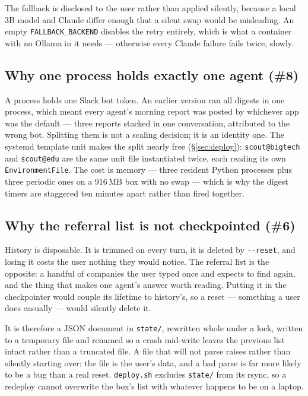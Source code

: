\documentclass[11pt,a4paper]{article}
\begin{document}
The fallback is disclosed to the user rather than applied silently, because a local 3B model
and Claude differ enough that a silent swap would be misleading. An empty
\texttt{FALLBACK\_\allowbreak{}BACKEND} disables the retry entirely, which is what a container with no
Ollama in it needs --- otherwise every Claude failure fails twice, slowly.

\subsection{Why one process holds exactly one agent (\#8)}

A process holds one Slack bot token. An earlier version ran all digests in one process,
which meant every agent's morning report was posted by whichever app was the default ---
three reports stacked in one conversation, attributed to the wrong bot. Splitting them is
not a scaling decision; it is an identity one. The systemd template unit makes the split
nearly free (\S\ref{sec:deploy}): \texttt{scout@bigtech} and \texttt{scout@edu} are the same
unit file instantiated twice, each reading its own \texttt{EnvironmentFile}. The cost is
memory --- three resident Python processes plus three periodic ones on a 916\,MB box with no
swap --- which is why the digest timers are staggered ten minutes apart rather than fired
together.

\subsection{Why the referral list is not checkpointed (\#6)}

History is disposable. It is trimmed on every turn, it is deleted by \texttt{-{}-reset}, and
losing it costs the user nothing they would notice. The referral list is the opposite: a
handful of companies the user typed once and expects to find again, and the thing that makes
one agent's answer worth reading. Putting it in the checkpointer would couple its lifetime to
history's, so a reset --- something a user does casually --- would silently delete it.

It is therefore a JSON document in \texttt{state/}, rewritten whole under a lock, written to
a temporary file and renamed so a crash mid-write leaves the previous list intact rather than
a truncated file. A file that will not parse raises rather than silently starting over: the
file is the user's data, and a bad parse is far more likely to be a bug than a real reset.
\texttt{deploy.sh} excludes \texttt{state/} from its rsync, so a redeploy cannot overwrite
the box's list with whatever happens to be on a laptop.
\end{document}
